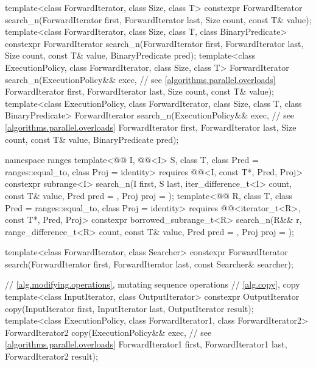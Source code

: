 \begin{codeblock}
{  template<class ForwardIterator, class Size, class T>
    constexpr ForwardIterator
      search_n(ForwardIterator first, ForwardIterator last,
               Size count, const T& value);
  template<class ForwardIterator, class Size, class T, class BinaryPredicate>
    constexpr ForwardIterator
      search_n(ForwardIterator first, ForwardIterator last,
               Size count, const T& value, BinaryPredicate pred);
  template<class ExecutionPolicy, class ForwardIterator, class Size, class T>
    ForwardIterator
      search_n(ExecutionPolicy&& exec,                          // see \ref{algorithms.parallel.overloads}
               ForwardIterator first, ForwardIterator last,
               Size count, const T& value);
  template<class ExecutionPolicy, class ForwardIterator, class Size, class T,
           class BinaryPredicate>
    ForwardIterator
      search_n(ExecutionPolicy&& exec,                          // see \ref{algorithms.parallel.overloads}
               ForwardIterator first, ForwardIterator last,
               Size count, const T& value,
               BinaryPredicate pred);

  namespace ranges {
    template<@@ I, @@<I> S, class T,
             class Pred = ranges::equal_to, class Proj = identity>
      requires @@<I, const T*, Pred, Proj>
      constexpr subrange<I>
        search_n(I first, S last, iter_difference_t<I> count,
                 const T& value, Pred pred = {}, Proj proj = {});
    template<@@ R, class T, class Pred = ranges::equal_to,
             class Proj = identity>
      requires @@<iterator_t<R>, const T*, Pred, Proj>
      constexpr borrowed_subrange_t<R>
        search_n(R&& r, range_difference_t<R> count,
                 const T& value, Pred pred = {}, Proj proj = {});
  }

  template<class ForwardIterator, class Searcher>
    constexpr ForwardIterator
      search(ForwardIterator first, ForwardIterator last, const Searcher& searcher);

  // \ref{alg.modifying.operations}, mutating sequence operations
  // \ref{alg.copy}, copy
  template<class InputIterator, class OutputIterator>
    constexpr OutputIterator copy(InputIterator first, InputIterator last,
                                  OutputIterator result);
  template<class ExecutionPolicy, class ForwardIterator1, class ForwardIterator2>
    ForwardIterator2 copy(ExecutionPolicy&& exec,               // see \ref{algorithms.parallel.overloads}
                          ForwardIterator1 first, ForwardIterator1 last,
                          ForwardIterator2 result);

}
\end{codeblock}
